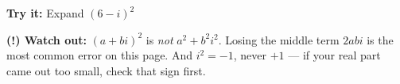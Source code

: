 \documentclass[12pt]{article}
\begin{document}
\begin{tryitbox}
\textbf{Try it:} \quad Expand $(6 - i)^2$\\[2pt]
\end{tryitbox}

\begin{watchoutbox}
\textbf{(!) Watch out:} $(a + bi)^2$ is \textit{not} $a^2 + b^2i^2$. Losing the
middle term $2abi$ is the most common error on this page. And $i^2 = -1$, never
$+1$ --- if your real part came out too small, check that sign first.
\end{watchoutbox}
\end{document}
